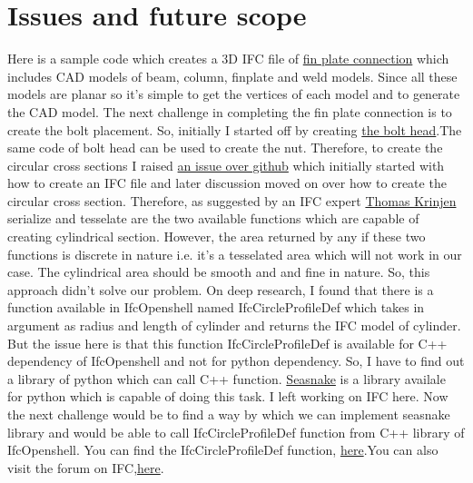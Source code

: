 \section{Issues and future scope}
Here is a sample code which creates a 3D IFC file of \href{https://github.com/chavan-vjti/IfcOpenShell/blob/master/Connection.py}{fin plate connection} which includes CAD models of beam, column, finplate and weld models. Since all these models are planar so it's simple to get the vertices of each model and to generate the CAD model.
The next challenge in completing the fin plate connection is to create the bolt placement. So, initially I started off by creating \href{https://github.com/chavan-vjti/IfcOpenShell/blob/master/Nut.py}{the bolt head}.The same code of bolt head can be used to create the nut. Therefore, to create the circular cross sections I raised \href{https://github.com/IfcOpenShell/IfcOpenShell/issues/300}{an issue over github} which initially started with how to create an IFC file and later discussion moved on over how to create the circular cross section.
Therefore, as suggested by an IFC expert \href{https://github.com/aothms}{Thomas Krinjen} serialize and tesselate are the two available functions which are capable of creating cylindrical section. However, the area returned by any if these two functions is discrete in nature i.e. it's a tesselated area which will not work in our case. The cylindrical area should be smooth and and fine in nature. So, this approach didn't solve our problem.
On deep research, I found that there is a function available in IfcOpenshell named IfcCircleProfileDef which takes in argument as radius and length of cylinder and returns the IFC model of cylinder. But the issue here is that this function IfcCircleProfileDef is available for C++ dependency of IfcOpenshell and not for python dependency. So, I have to find out a library of python which can call C++ function.
\href{https://pypi.python.org/pypi/seasnake/0.0.0}{Seasnake} is a library availale for python which is capable of doing this task. I left working on IFC here. Now the next challenge would be to find a way by which we can implement seasnake library and would be able to call IfcCircleProfileDef function from C++ library of IfcOpenshell.
You can find the IfcCircleProfileDef function, \href{https://github.com/IfcOpenShell/IfcOpenShell/blob/master/src/examples/profiles.cpp}{here}.You can also visit the forum on IFC,\href{https://sourceforge.net/p/ifcopenshell/discussion/1782717/thread/d09c83b7/?limit=25}{here}.
